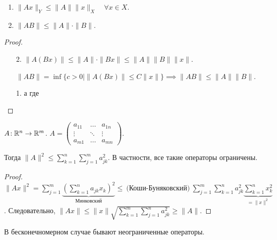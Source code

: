 \begin{consequence}
    \begin{enumerate}
        \item $\|Ax\|_Y \le \| A \| \|x\|_X \quad \forall x\in X$.
        \item $\| A B \| \le \|A \| \cdot \|B\|$.
    \end{enumerate}
\end{consequence}
\begin{proof}
    \begin{enumerate}
        \item[2.] $\|A(Bx)\| \le \|A\| \cdot \|Bx\| \le \| A \| \|B\| \|x \|$.

        $\|AB\| = \inf \{c > 0 \mid \|A(Bx)\| \le C\|x\|\} \implies \| AB\| \le \|A\|\|B\|$.

    \item[1.] а где
    \end{enumerate}
\end{proof}
\begin{theorem}
    $A\!: \mathbb{R}^n \to \mathbb{R}^m$.  $A = \begin{pmatrix} a_{11} & \ldots & a_{1n} \\ \vdots & \ddots & \vdots \\ a_{m1} & \ldots & a_{mn} \end{pmatrix}$.

    Тогда $\|A\|^2 \le \sum\limits_{k=1}^n \sum\limits_{j=1}^m a_{jk}^2$. В частности, все такие операторы ограничены.
\end{theorem}
\begin{proof}
    $\|Ax\|^2 = \sum\limits_{j=1}^m \underbrace{\left(\sum\limits_{k=1}^n a_{jk} x_k \right)^2}_{\text{Минковский}} \le\ \text{(Коши-Буняковский)}\ \sum\limits_{j=1}^m \sum\limits_{k=1}^n a_{jk}^2 \underbrace{\sum\limits_{k=1}^n x_k^2}_{=\|x\|^2}$. Следовательно, $\|Ax\| \le \|x\| \sqrt{\sum\limits_{k=1}^m \sum\limits_{j=1}^n a_{jk}^2} \ge \|A\|$.
\end{proof}
\begin{remark}
    В бесконечномерном случае бывают неограниченные операторы.
\end{remark}

